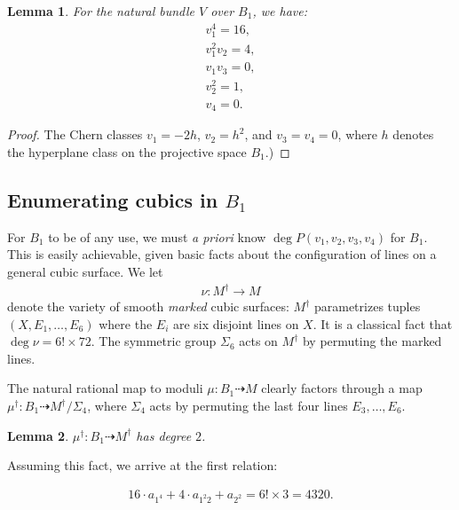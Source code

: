 \documentclass[12 pt]{amsart}
\newtheorem{lemma}{Lemma}[section]
\newcommand{\<}{\left\langle}
\renewcommand{\>}{\right\rangle}
\begin{document}
\begin{lemma}
  \label{lemma:chernB1}
  For the natural bundle $V$ over $B_1$, we have:
  \begin{align}\nonumber
    v_{1}^{4} = 16,\\\nonumber
    v_{1}^{2}v_{2} = 4,\\\nonumber
    v_{1}v_{3} =0,\\\nonumber
    v_2^{2} = 1,\\\nonumber
    v_{4} = 0.
  \end{align}
\end{lemma}

\begin{proof}
The Chern classes $v_{1} = -2h$, $v_{2}=h^2$, and $v_{3}= v_{4}=0$,
where $h$ denotes the hyperplane class on the projective space $B_1$.)
  
\end{proof}

\subsection{Enumerating cubics in $B_1$}
\label{sec:enum-cubics-b_1}


For $B_1$ to be of any use, we must {\sl a priori} know
$\deg P(v_{1},v_{2},v_{3},v_{4})$ for $B_1$. This is easily
achievable, given basic facts about the configuration of lines on a
general cubic surface. We let
\begin{align}
  \label{eq:nu}
  \nu: M^{\dagger} \to M
  \end{align}
  denote the variety of smooth {\sl marked} cubic surfaces:
  $M^{\dagger}$ parametrizes tuples $(X, E_{1}, \dots, E_{6})$ where
  the $E_{i}$ are six disjoint lines on $X$. It is a classical fact
  that $\deg \nu = 6! \times 72$. The symmetric group $\Sigma_6$ acts
  on $M^{\dagger}$ by permuting the marked lines.

  The natural rational map to moduli $\mu : B_1 \dashrightarrow M$
  clearly factors through a map
  $\mu^{\dagger}: B_1 \dashrightarrow M^{\dagger}/\Sigma_{4}$, where
  $\Sigma_{4}$ acts by permuting the last four lines
  $E_{3}, \dots, E_{6}$.

  \begin{lemma}
    \label{lemma:degreemudaggerB1}
    $\mu^{\dagger}: B_1 \dashrightarrow M^{\dagger}$ has degree $2$.
  \end{lemma}

Assuming this fact, we arrive at the first relation:

\begin{align}
  \label{eq:relation1}
  16 \cdot a_{1^4} + 4 \cdot a_{1^2 2} + a_{2^2} = 6! \times 3 = 4320.
\end{align}
\end{document}
